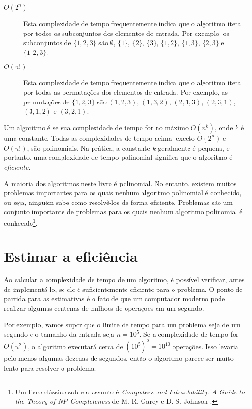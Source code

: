 \begin{description}
\item[$O(2^n)$]
Esta complexidade de tempo frequentemente indica que o algoritmo itera por todos os subconjuntos dos elementos de entrada.
Por exemplo, os subconjuntos de $\{1,2,3\}$ são 
$\emptyset$, $\{1\}$, $\{2\}$, $\{3\}$, $\{1,2\}$,
$\{1,3\}$, $\{2,3\}$ e $\{1,2,3\}$.

\item[$O(n!)$]
Esta complexidade de tempo frequentemente indica que o algoritmo itera por todas as permutações dos elementos de entrada.
Por exemplo, as permutações de $\{1,2,3\}$ são
$(1,2,3)$, $(1,3,2)$, $(2,1,3)$, $(2,3,1)$,
$(3,1,2)$ e $(3,2,1)$.

\end{description}

Um algoritmo é  
se sua complexidade de tempo for no máximo $O(n^k)$, 
onde $k$ é uma constante. 
Todas as complexidades de tempo acima, exceto 
$O(2^n)$ e $O(n!)$, são polinomiais. 
Na prática, a constante $k$ geralmente é pequena, 
e portanto, uma complexidade de tempo polinomial
significa que o algoritmo é \emph{eficiente}.


A maioria dos algoritmos neste livro é polinomial. No entanto, existem muitos problemas importantes para os quais nenhum algoritmo polinomial é conhecido, ou seja, ninguém sabe como resolvê-los de forma eficiente. Problemas  são um conjunto importante de problemas para os quais nenhum algoritmo polinomial é conhecido\footnote{Um livro clássico sobre o assunto é \emph{Computers and Intractability: A Guide to the Theory of NP-Completeness} de M. R. Garey e D. S. Johnson \cite{gar79}.}.

\section{Estimar a eficiência}

Ao calcular a complexidade de tempo de um algoritmo, é possível verificar, antes de implementá-lo, se ele é suficientemente eficiente para o problema. O ponto de partida para as estimativas é o fato de que um computador moderno pode realizar algumas centenas de milhões de operações em um segundo.

Por exemplo, vamos supor que o limite de tempo 
para um problema seja de um segundo e o tamanho da entrada seja $n=10^5$. 
Se a complexidade de tempo for $O(n^2)$, 
o algoritmo executará cerca de $(10^5)^2=10^{10}$ operações. 
Isso levaria pelo menos algumas dezenas de segundos, 
então o algoritmo parece ser muito lento para resolver o problema.

